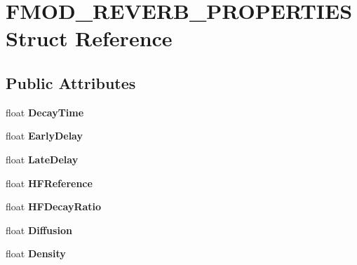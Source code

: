\hypertarget{structFMOD__REVERB__PROPERTIES}{}\section{F\+M\+O\+D\+\_\+\+R\+E\+V\+E\+R\+B\+\_\+\+P\+R\+O\+P\+E\+R\+T\+I\+ES Struct Reference}
\label{structFMOD__REVERB__PROPERTIES}
\subsection*{Public Attributes}
\begin{DoxyCompactItemize}
\item 
\mbox{\label{structFMOD__REVERB__PROPERTIES_a96c2f0bf909c70708440ff25b709fd43}} 
float {\bfseries Decay\+Time}
\item 
\mbox{\label{structFMOD__REVERB__PROPERTIES_aa5bbe3e02a57f21c97a0a2bd520bde00}} 
float {\bfseries Early\+Delay}
\item 
\mbox{\label{structFMOD__REVERB__PROPERTIES_a5931de0fd5b8705eb043d272e87c42d5}} 
float {\bfseries Late\+Delay}
\item 
\mbox{\label{structFMOD__REVERB__PROPERTIES_ac0d48e7775cc35e434535d7b0f41d425}} 
float {\bfseries H\+F\+Reference}
\item 
\mbox{\label{structFMOD__REVERB__PROPERTIES_a7371380136e7ff3fd70c8059df9981b8}} 
float {\bfseries H\+F\+Decay\+Ratio}
\item 
\mbox{\label{structFMOD__REVERB__PROPERTIES_ae4b36833e4d30de592c954af2f0c55b3}} 
float {\bfseries Diffusion}
\item 
\mbox{\label{structFMOD__REVERB__PROPERTIES_a3672d989ace5e2dc4450b7677fa83f75}} 
float {\bfseries Density}
\item 
\mbox{\label{structFMOD__REVERB__PROPERTIES_af3531e00fb03228d8b47c82f7390cd32}} 

\end{DoxyCompactItemize}
